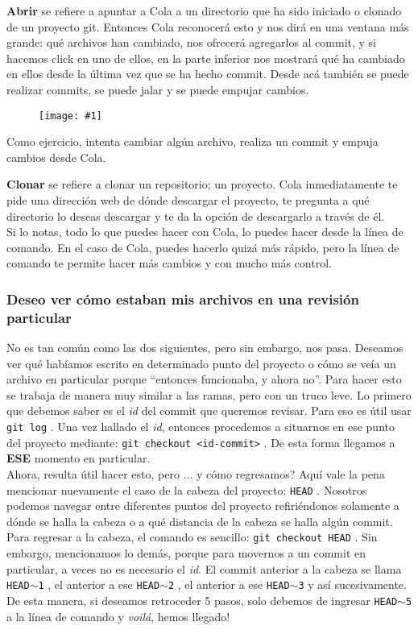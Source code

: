 \documentclass[10pt,letterpaper]{article}
\newcommand{\inlinecode}[1]{
\colorbox{light-gray}{\texttt{#1}}
}
\newcommand{\Picture}[1]
{
	\begin{figure}[H]
	\begin{flushleft}
	\texttt{[image: \#1]}
	\end{flushleft}
	\end{figure}
}
\begin{document}
\textbf{Abrir} se refiere a apuntar a Cola a un directorio que ha sido iniciado o clonado de un proyecto git. Entonces Cola reconocer\'a esto y nos dir\'a en una ventana m\'as grande: qu\'e archivos han cambiado, nos ofrecer\'a agregarlos al commit, y si hacemos click en uno de ellos, en la parte inferior nos mostrar\'a qu\'e ha cambiado en ellos desde la \'ultima vez que se ha hecho commit. Desde ac\'a tambi\'en se puede realizar commits, se puede jalar y se puede empujar cambios.

\Picture{img/cola2.png}

Como ejercicio, intenta cambiar alg\'un archivo, realiza un commit y empuja cambios desde Cola.

\textbf{Clonar} se refiere a clonar un repositorio; un proyecto. Cola inmediatamente te pide una direcci\'on web de d\'onde descargar el proyecto, te pregunta a qu\'e directorio lo deseas descargar y te da la opci\'on de descargarlo a trav\'es de \'el.\\

Si lo notas, todo lo que puedes hacer con Cola, lo puedes hacer desde la l\'inea de comando. En el caso de Cola, puedes hacerlo quiz\'a m\'as r\'apido, pero la l\'inea de comando te permite hacer m\'as cambios y con mucho m\'as control.

\subsubsection{Deseo ver c\'omo estaban mis archivos en una revisi\'on particular}
No es tan com\'un como las dos siguientes, pero sin embargo, nos pasa. Deseamos ver qu\'e hab\'iamos escrito en determinado punto del proyecto o c\'omo se ve\'ia un archivo en particular porque ``entonces funcionaba, y ahora no''. Para hacer esto se trabaja de manera muy similar a las ramas, pero con un truco leve. Lo primero que debemos saber es el \emph{id} del commit que queremos revisar. Para eso es \'util usar \inlinecode{git log}. Una vez hallado el \emph{id}, entonces procedemos a situarnos en ese punto del proyecto mediante: \inlinecode{git checkout <id-commit>}. De esta forma llegamos a \textbf{ESE} momento en particular.\\

Ahora, resulta \'util hacer esto, pero ... y c\'omo regresamos? Aqu\'i vale la pena mencionar nuevamente el caso de la cabeza del proyecto: \inlinecode{HEAD}. Nosotros podemos navegar entre diferentes puntos del proyecto refiri\'endonos solamente a d\'onde se halla la cabeza o a qu\'e distancia de la cabeza se halla alg\'un commit. Para regresar a la cabeza, el comando es sencillo: \inlinecode{git checkout HEAD}. Sin embargo, mencionamos lo dem\'as, porque para movernos a un commit en particular, a veces no es necesario el \emph{id}. El commit anterior a la cabeza se llama \inlinecode{HEAD$\sim$1}, el anterior a ese \inlinecode{HEAD$\sim$2}, el anterior a ese \inlinecode{HEAD$\sim$3} y as\'i sucesivamente. De esta manera, si deseamos retroceder 5 pasos, solo debemos de ingresar \inlinecode{HEAD$\sim$5} a la l\'inea de comando y \emph{voil\'a}, hemos llegado!
\end{document}
